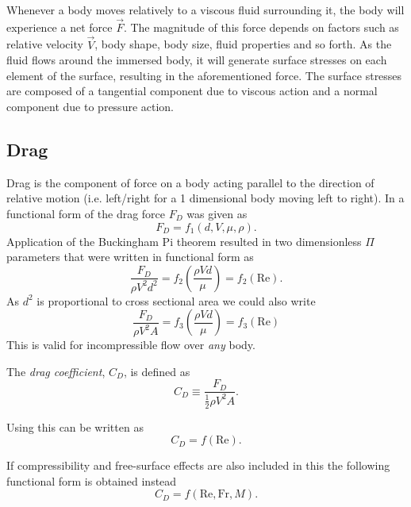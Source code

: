 
Whenever a body moves relatively to a viscous fluid surrounding it, the body will experience a net force $\Vec{F}$.
The magnitude of this force depends on factors such as relative velocity $\Vec{V}$, body shape, body size, fluid properties and so forth.
As the fluid flows around the immersed body, it will generate surface stresses on each element of the surface, resulting in the aforementioned force.
The surface stresses are composed of a tangential component due to viscous action and a normal component due to pressure action.

\subsection{Drag}
Drag is the component of force on a body acting parallel to the direction of relative motion (i.e. left/right for a 1 dimensional body moving left to right). 
In  a functional form of the drag force $F_D$ was given as
\[ 
F_D = f_1 (d, V, \mu, \rho)
.\]
Application of the Buckingham Pi theorem resulted in two dimensionless $\Pi$ parameters that were written in functional form as
\[ 
\frac{F_D}{\rho V^2 d^2} = f_2 \left( \frac{\rho V d}{\mu} \right) = f_2 \left( \mathrm{Re} \right)
.\]
As $d^2$ is proportional to cross sectional area we could also write
\begin{equation} \label{eq:dragdim}
  \frac{F_D}{\rho V^2 A} = f_3 \left( \frac{\rho V d}{\mu} \right) = f_3 \left( \mathrm{Re} \right)
\end{equation}
This is valid for incompressible flow over \textit{any} body.

The \textit{drag coefficient}, $C_D$, is defined as
\begin{equation*}
  C_D \equiv \frac{F_D}{\frac{1}{2}\rho V^2 A}
.\end{equation*}

Using this  can be written as
\begin{equation*}
  C_D = f(\mathrm{Re})
.\end{equation*}

If compressibility and free-surface effects are also included in this the following functional form is obtained instead
\begin{equation*}
  C_D = f(\mathrm{Re}, \mathrm{Fr}, M)
.\end{equation*}


